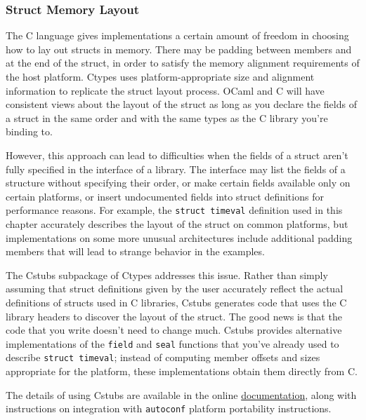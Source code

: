 \hypertarget{struct-memory-layout}{%
\subsubsection{Struct Memory Layout}\label{struct-memory-layout}}

The C language gives implementations a certain amount of freedom in
choosing how to lay out structs in memory. There may be padding between
members and at the end of the struct, in order to satisfy the memory
alignment requirements of the host platform. Ctypes uses
platform-appropriate size and alignment information to replicate the
struct layout process. OCaml and C will have consistent views about the
layout of the struct as long as you declare the fields of a struct in
the same order and with the same types as the C library you're binding
to. 

However, this approach can lead to difficulties when the fields of a
struct aren't fully specified in the interface of a library. The
interface may list the fields of a structure without specifying their
order, or make certain fields available only on certain platforms, or
insert undocumented fields into struct definitions for performance
reasons. For example, the \passthrough{\lstinline!struct timeval!}
definition used in this chapter accurately describes the layout of the
struct on common platforms, but implementations on some more unusual
architectures include additional padding members that will lead to
strange behavior in the examples.

The Cstubs subpackage of Ctypes addresses this issue. Rather than simply
assuming that struct definitions given by the user accurately reflect
the actual definitions of structs used in C libraries, Cstubs generates
code that uses the C library headers to discover the layout of the
struct. The good news is that the code that you write doesn't need to
change much. Cstubs provides alternative implementations of the
\passthrough{\lstinline!field!} and \passthrough{\lstinline!seal!}
functions that you've already used to describe
\passthrough{\lstinline!struct timeval!}; instead of computing member
offsets and sizes appropriate for the platform, these implementations
obtain them directly from C.

The details of using Cstubs are available in the online
\href{https://ocamllabs.github.io/ocaml-ctypes}{documentation}, along
with instructions on integration with \passthrough{\lstinline!autoconf!}
platform portability instructions.~
